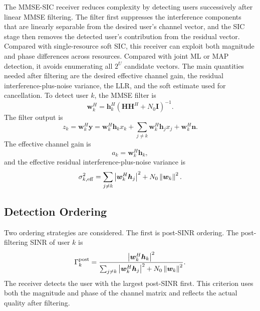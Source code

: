 The MMSE-SIC receiver reduces complexity by detecting users successively after linear MMSE filtering. The filter first suppresses the interference components that are linearly separable from the desired user's channel vector, and the SIC stage then removes the detected user's contribution from the residual vector. Compared with single-resource soft SIC, this receiver can exploit both magnitude and phase differences across resources. Compared with joint ML or MAP detection, it avoids enumerating all $2^U$ candidate vectors. The main quantities needed after filtering are the desired effective channel gain, the residual interference-plus-noise variance, the LLR, and the soft estimate used for cancellation. To detect user $k$, the MMSE filter is
\begin{equation}
    \bm{w}_k^H
    =
    \bm{h}_k^H
    \left(\bm{H}\bm{H}^H+N_0\bm{I}\right)^{-1}.
    \label{eq:mmse-filter}
\end{equation}
The filter output is
\begin{equation}
    z_k
    =
    \bm{w}_k^H\bm{y}
    =
    \bm{w}_k^H\bm{h}_k x_k
    +
    \sum_{j\ne k}\bm{w}_k^H\bm{h}_j x_j
    +
    \bm{w}_k^H\bm{n}.
    \label{eq:mmse-filter-output}
\end{equation}
The effective channel gain is
\begin{equation}
    a_k=\bm{w}_k^H\bm{h}_k,
\end{equation}
and the effective residual interference-plus-noise variance is
\begin{equation}
    \sigma^2_{k,\mathrm{eff}}
    =
    \sum_{j\ne k}\left\lvert \bm{w}_k^H\bm{h}_j \right\rvert^2
    +
    N_0\left\lVert \bm{w}_k \right\rVert^2 .
    \label{eq:mmse-effective-variance}
\end{equation}

\subsection{Detection Ordering}

Two ordering strategies are considered. The first is post-SINR ordering. The post-filtering SINR of user $k$ is
\begin{equation}
    \Gamma^{\mathrm{post}}_k
    =
    \frac{\left\lvert \bm{w}_k^H\bm{h}_k \right\rvert^2}
    {\sum_{j\ne k}\left\lvert \bm{w}_k^H\bm{h}_j \right\rvert^2+N_0\left\lVert \bm{w}_k \right\rVert^2}.
    \label{eq:post-sinr}
\end{equation}
The receiver detects the user with the largest post-SINR first. This criterion uses both the magnitude and phase of the channel matrix and reflects the actual quality after filtering.

